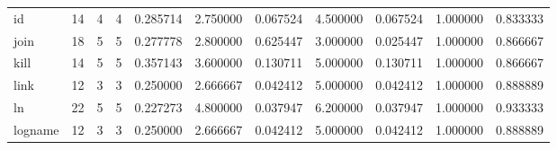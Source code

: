 \begin{tabular}{lrrrrrrrrrr}
id        &                                      14 &                  4 &                                 4 &                                   0.285714 &                               2.750000 &                                     0.067524 &                          4.500000 &                                0.067524 &                           1.000000 &                                           0.833333 \\
join      &                                      18 &                  5 &                                 5 &                                   0.277778 &                               2.800000 &                                     0.625447 &                          3.000000 &                                0.025447 &                           1.000000 &                                           0.866667 \\
kill      &                                      14 &                  5 &                                 5 &                                   0.357143 &                               3.600000 &                                     0.130711 &                          5.000000 &                                0.130711 &                           1.000000 &                                           0.866667 \\
link      &                                      12 &                  3 &                                 3 &                                   0.250000 &                               2.666667 &                                     0.042412 &                          5.000000 &                                0.042412 &                           1.000000 &                                           0.888889 \\
ln        &                                      22 &                  5 &                                 5 &                                   0.227273 &                               4.800000 &                                     0.037947 &                          6.200000 &                                0.037947 &                           1.000000 &                                           0.933333 \\
logname   &                                      12 &                  3 &                                 3 &                                   0.250000 &                               2.666667 &                                     0.042412 &                          5.000000 &                                0.042412 &                           1.000000 &                                           0.888889 \\

\end{tabular}
